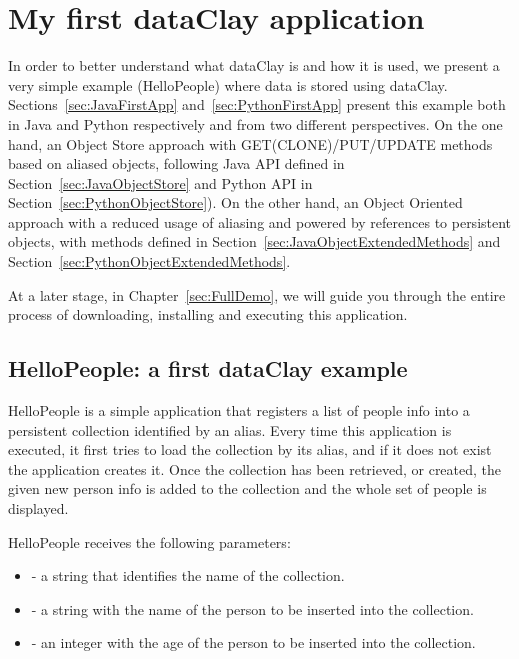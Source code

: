 
\chapter{My first dataClay application}
\label{sec:MyFirstApplication}

In order to better understand what dataClay is and how it is used, we present a very simple example (HelloPeople) where data is stored using dataClay. Sections~\ref{sec:JavaFirstApp} and~\ref{sec:PythonFirstApp} present this example both in Java and Python respectively and from two different perspectives. On the one hand, an Object Store approach with GET(CLONE)/PUT/UPDATE methods based on aliased objects, following Java API defined in Section~\ref{sec:JavaObjectStore} and Python API in Section~\ref{sec:PythonObjectStore}). On the other hand, an Object Oriented approach with a reduced usage of aliasing and powered by references to persistent objects, with methods defined in Section~\ref{sec:JavaObjectExtendedMethods} and Section~\ref{sec:PythonObjectExtendedMethods}.

At a later stage, in Chapter~\ref{sec:FullDemo}, we will guide you through the entire process of downloading, installing and executing this application.

\section{HelloPeople: a first dataClay example}
\label{sec:HelloPeople}

HelloPeople is a simple application that registers a list of people info into a persistent collection identified by an alias. Every time this application is executed, it first tries to load the collection by its alias, and if it does not exist the application creates it. Once the collection has been retrieved, or created, the given new person info is added to the collection and the whole set of people is displayed.

HelloPeople receives the following parameters:

\begin{itemize}
    \item - a string that identifies the name of the collection.
    \item - a string with the name of the person to be inserted into the collection.
    \item - an integer with the age of the person to be inserted into the collection.
\end{itemize}

